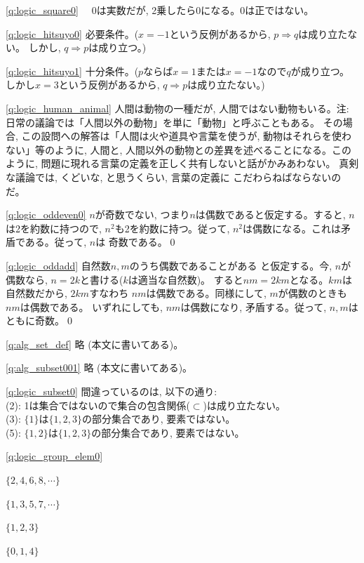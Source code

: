\ref{q:logic_square0} 
　0は実数だが, 2乗したら0になる。0は正ではない。
\hv

\ref{q:logic_hitsuyo0}
必要条件。($x=-1$という反例があるから, $p\Longrightarrow q$は成り立たない。
しかし, $q\Longrightarrow p$は成り立つ。)
\hv

\ref{q:logic_hitsuyo1}
十分条件。($p$ならば$x=1$または$x=-1$なので$q$が成り立つ。
しかし$x=3$という反例があるから, $q\Longrightarrow p$は成り立たない。)
\hv


\ref{q:logic_human_animal}
人間は動物の一種だが, 人間ではない動物もいる。{\small 注: 
日常の議論では「人間以外の動物」を単に「動物」と呼ぶこともある。
その場合, この設問への解答は「人間は火や道具や言葉を使うが, 
動物はそれらを使わない」等のように, 人間と, 
人間以外の動物との差異を述べることになる。このように, 
問題に現れる言葉の定義を正しく共有しないと話がかみあわない。 
真剣な議論では, くどいな, と思うくらい, 言葉の定義に
こだわらねばならないのだ。}
\hv


\ref{q:logic_oddeven0}
$n$が奇数でない, つまり$n$は偶数であると仮定する。すると, $n$は2を約数に持つので, 
$n^2$も2を約数に持つ。従って, $n^2$は偶数になる。これは矛盾である。従って, $n$は
奇数である。\qed
\hv

\ref{q:logic_oddadd}
自然数$n, m$のうち偶数であることがある
と仮定する。今, $n$が偶数なら, $n=2k$と書ける($k$は適当な自然数)。
すると$nm=2km$となる。$km$は自然数だから, $2km$すなわち
$nm$は偶数である。同様にして, $m$が偶数のときも$nm$は偶数である。
いずれにしても, $nm$は偶数になり, 矛盾する。従って, 
$n, m$はともに奇数。\qed
\hv

\ref{q:alg_set_def} 略 (本文に書いてある)。
\mv

\ref{q:alg_subset001} 略 (本文に書いてある)。
\mv

\ref{q:logic_subset0} 間違っているのは, 以下の通り:\\
(2): 1は集合ではないので集合の包含関係($\subset$)は成り立たない。\\
(3): $\{1\}$は$\{1, 2, 3\}$の部分集合であり, 要素ではない。\\
(5): $\{1, 2\}$は$\{1, 2, 3\}$の部分集合であり, 要素ではない。\\
\hv

\ref{q:logic_group_elem0}
\begin{edaenumerate}
\item $\{2, 4, 6, 8, \cdots \}$
\item $\{1, 3, 5, 7, \cdots \}$
\item $\{1, 2, 3\}$
\item $\{0, 1, 4\}$
\end{edaenumerate}
\hv

